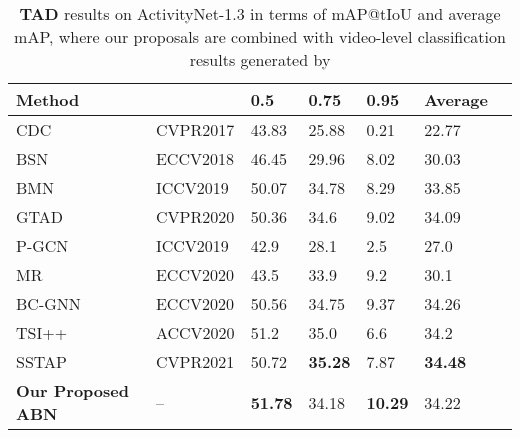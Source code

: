 \documentclass{ieeeaccess}
\begin{document}
\begin{table*}[ht]
\centering
\caption{\textbf{TAD} results on ActivityNet-1.3 in terms of mAP@tIoU and average mAP, where our proposals are combined with video-level classification results generated by \cite{action_protocol}}
\begin{tabular}{l l l l l l l}
\hline
Method & & 0.5    & 0.75  & 0.95 & Average \\ \hline
CDC \cite{CDC} & CVPR2017  & 43.83  & 25.88 & 0.21 & 22.77   \\ 
BSN \cite{lin2018bsn} & ECCV2018 &  46.45 & 29.96 & 8.02 & 30.03 \\ 
BMN \cite{bmn}   & ICCV2019            & 50.07 & 34.78 & 8.29 & 33.85 \\
GTAD \cite{xu2020gtad} & CVPR2020   & 50.36 & 34.6 & 9.02 & 34.09 \\ 
P-GCN\cite{pgcn_cvpr2020}   & ICCV2019   & 42.9 & 28.1 & 2.5 & 27.0 \\
MR\cite{MR_eccv2020}  & ECCV2020      & 43.5 & 33.9 & 9.2 & 30.1 \\
BC-GNN~\cite{bai2020boundary} & ECCV2020 & 50.56 & 34.75 & 9.37 &  34.26 \\
TSI++~\cite{tsi_accv} & ACCV2020      & 51.2 & 35.0 & 6.6 & 34.2 \\
SSTAP~\cite{wang2021self} & CVPR2021& 50.72 & \textbf{35.28} & 7.87 &  \textbf{34.48} \\
\hline
\textbf{Our Proposed ABN  }  & -- & \textbf{51.78} & 34.18 & \textbf{10.29} & 34.22
\\
\hline
\end{tabular}
\label{action_detection_activitynet}
\end{table*}
\end{document}

